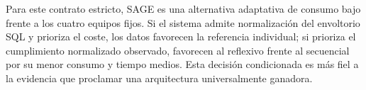 Para este contrato estricto, SAGE es una alternativa adaptativa de consumo bajo
frente a los cuatro equipos fijos. Si el sistema admite normalización del
envoltorio SQL y prioriza el coste, los datos favorecen la referencia individual;
si prioriza el cumplimiento normalizado observado, favorecen al reflexivo frente
al secuencial por su menor consumo y tiempo medios. Esta decisión condicionada
es más fiel a la evidencia que proclamar una arquitectura universalmente ganadora.
